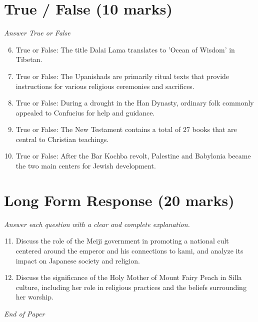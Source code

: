 \documentclass[12pt]{article}
\begin{document}
\section*{True / False (10 marks)}
\textit{Answer True or False}
\begin{enumerate}[label=\arabic*.]
\setcounter{enumi}{5}
\item True or False: The title Dalai Lama translates to 'Ocean of Wisdom' in Tibetan.
\item True or False: The Upanishads are primarily ritual texts that provide instructions for various religious ceremonies and sacrifices.
\item True or False: During a drought in the Han Dynasty, ordinary folk commonly appealed to Confucius for help and guidance.
\item True or False: The New Testament contains a total of 27 books that are central to Christian teachings.
\item True or False: After the Bar Kochba revolt, Palestine and Babylonia became the two main centers for Jewish development.
\end{enumerate}

\section*{Long Form Response (20 marks)}
\textit{Answer each question with a clear and complete explanation.}
\begin{enumerate}[label=\arabic*.]
\setcounter{enumi}{10}
\item Discuss the role of the Meiji government in promoting a national cult centered around the emperor and his connections to kami, and analyze its impact on Japanese society and religion.
\item Discuss the significance of the Holy Mother of Mount Fairy Peach in Silla culture, including her role in religious practices and the beliefs surrounding her worship.
\end{enumerate}

\vfill
\noindent\textit{End of Paper}
\end{document}
